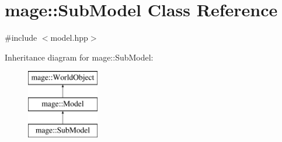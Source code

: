 \hypertarget{classmage_1_1_sub_model}{}\section{mage\+:\+:Sub\+Model Class Reference}
\label{classmage_1_1_sub_model}


{\ttfamily \#include $<$model.\+hpp$>$}

Inheritance diagram for mage\+:\+:Sub\+Model\+:\begin{figure}[H]
\begin{center}
\leavevmode
\includegraphics[height=3.000000cm]{classmage_1_1_sub_model}
\end{center}
\end{figure}

